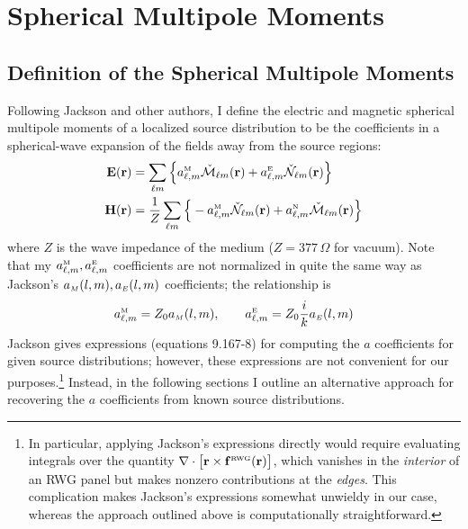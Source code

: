\documentclass[letterpaper]{article}
\begin{document}
\section{Spherical Multipole Moments}

\subsection*{Definition of the Spherical Multipole Moments}

Following Jackson and other authors, I define the 
electric and magnetic spherical multipole moments of a localized source 
distribution to be the coefficients in a spherical-wave
expansion of the fields away from the source regions:
\begin{subequations}
\begin{align}
 \mathbf{E}(\mathbf{r}) &= \sum_{\ell m} \Big\{  a^{\hbox{\tiny{M}}}_{\ell,m} \check{\mathcal{M}}_{\ell m}(\mathbf{r})
                                      +a^{\hbox{\tiny{E}}}_{\ell,m} \check{\mathcal{N}}_{\ell m}(\mathbf{r})
                               \Big\}
\\
 \mathbf{H}(\mathbf{r}) &= \frac{1}{Z}
                 \sum_{\ell m} \Big\{ -a^{\hbox{\tiny{M}}}_{\ell,m} \check{\mathcal{N}}_{\ell m}(\mathbf{r})
                                      +a^{\hbox{\tiny{N}}}_{\ell,m} \check{\mathcal{M}}_{\ell m}(\mathbf{r})
                               \Big\}
\end{align}
\label{SphericalMultipoleDefinitions}
\end{subequations}
where $Z$ is the wave impedance of the medium ($Z=377\,\Omega$ for vacuum).
Note that my $a^{\hbox{\tiny{M}}}_{\ell,m}, a^{\hbox{\tiny{E}}}_{\ell,m}$ coefficients
are not normalized in quite the same way as Jackson's
$a_{\hbox{\tiny{$M$}}}(l,m), a_{\hbox{\tiny{$E$}}}(l,m)$ coefficients; 
the relationship is 
$$ a^{\hbox{\tiny{M}}}_{\ell,m} = Z_0 a_{\hbox{\tiny{$M$}}}(l,m), \qquad 
   a^{\hbox{\tiny{E}}}_{\ell,m} = Z_0 \frac{i}{k} a_{\hbox{\tiny{$E$}}}(l,m)
$$
Jackson gives expressions (equations 9.167-8) for computing 
the $a$ coefficients for given source distributions; however, 
these expressions are not convenient for our 
purposes.\footnote{In particular, applying Jackson's expressions
directly would require evaluating integrals over the quantity 
$\nabla\cdot \big[\mathbf{r} \times \mathbf{f}^{\hbox{\tiny{RWG}}}(\mathbf{r})\big]$,
which vanishes in the \textit{interior} of an RWG panel but makes
nonzero contributions at the \textit{edges}. This complication
makes Jackson's expressions somewhat unwieldy in our case, 
whereas the approach outlined above is computationally 
straightforward.} Instead, in the following sections I outline
an alternative approach for recovering the $a$ coefficients
from known source distributions.
\end{document}
